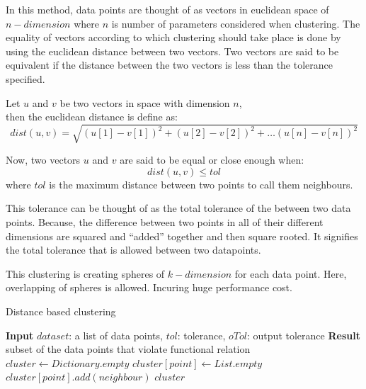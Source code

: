 In this method, data points are thought of as vectors in euclidean space of \(n-dimension\) where \(n\) is number of parameters considered when clustering. The equality of vectors according to which clustering should take place is done by using the euclidean distance between two vectors. Two vectors are said to be equivalent if the distance between the two vectors is less than the tolerance specified.

Let \(u\) and \(v\) be two vectors in space with dimension \(n\),\\
then the euclidean distance is define as: \\
\[dist(u, v) = \sqrt{(u[1] - v[1])^2 + (u[2] - v[2])^2 + \ldots (u[n] - v[n])^2}\]

Now, two vectors \(u\) and \(v\) are said to be equal or close enough when:\\
\[dist(u,v) \leq tol\]  where \(tol\) is the maximum distance between two points to call them neighbours.

This tolerance can be thought of as the total tolerance of the between two data points. Because, the difference between two points in all of their different dimensions are squared and ``added'' together and then square rooted. It signifies the total tolerance that is allowed between two datapoints. 

This clustering is creating spheres of \(k-dimension\) for each data point. Here, overlapping of spheres is allowed. Incuring huge performance cost.

\begin{algorithm}
	\caption{Distance based clustering}\label{alg:dbscanExistence}
	\begin{algorithmic}[1]
		\State \textbf{Input} $dataset$: a list of data points, $tol$: tolerance, $oTol$: output tolerance
		\State \textbf{Result} subset of the data points that violate functional relation
		\State $cluster \gets Dictionary.empty$
		 
		\State $cluster[point] \gets List.empty$ 	
         
        \State $cluster[point].add(neighbour)$
        \EndIf
        \EndFor
        \EndFor
        \State\Return $cluster$
		\EndProcedure
	\end{algorithmic}
\end{algorithm}


